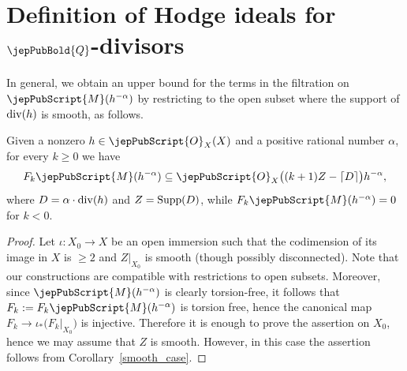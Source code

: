 \section{Definition of Hodge ideals for \texorpdfstring{\mbox{\normalsize$\jepPubBold{Q}$}}{Q}-divisors}\label{definition}
In general, we obtain an upper bound for the terms in the filtration on $\jepPubScript{M}(h^{-\alpha})$
by restricting to the open subset where the support of ${\rm div}(h)$ is smooth, as follows.



\begin{proposition}\label{prop_for_def}
Given a nonzero $h\in\jepPubScript{O}_X(X)$ and a positive rational number $\alpha$, 
for every $k\geqslant 0$ we have 
$$F_k\jepPubScript{M}(h^{-\alpha})\subseteq \jepPubScript{O}_X\big((k+1)Z-\lceil D\rceil \big)h^{-\alpha},$$
where $D=\alpha\cdot {\rm div}(h)$ and $Z={\rm Supp}(D)$,
while $F_k\jepPubScript{M}(h^{-\alpha})=0$ for $k<0$.
\end{proposition}

\begin{proof}
Let $\iota\colon X_0\to X$ be an open immersion such that the codimension of its image in $X$ is $\geqslant 2$ and $Z\vert_{X_0}$ is smooth (though possibly disconnected).
Note that our constructions are compatible with restrictions to open subsets. Moreover, since $\jepPubScript{M}(h^{-\alpha})$ is clearly torsion-free, it follows that
$F_k:=F_k\jepPubScript{M}(h^{-\alpha})$ is torsion free, hence the canonical map $F_k\to \iota_*\big(F_k\vert_{X_0}\big)$ is injective. Therefore it is enough to prove the assertion on 
$X_0$, hence we may assume that $Z$ is smooth. However, in this case the assertion follows 
from Corollary~\ref{smooth_case}.
\end{proof}


